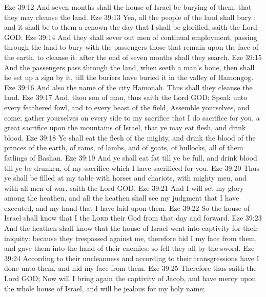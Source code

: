 \vs Eze 39:12 And seven months shall the house of Israel be burying of them, that they may cleanse the land.
\vs Eze 39:13 Yea, all the people of the land shall bury ; and it shall be to them a renown the day that I shall be glorified, saith the Lord GOD.
\vs Eze 39:14 And they shall sever out men of continual employment, passing through the land to bury with the passengers those that remain upon the face of the earth, to cleanse it: after the end of seven months shall they search.
\vs Eze 39:15 And the passengers  pass through the land, when  seeth a man's bone, then shall he set up a sign by it, till the buriers have buried it in the valley of Hamongog.
\vs Eze 39:16 And also the name of the city  Hamonah. Thus shall they cleanse the land.
\vs Eze 39:17 And, thou son of man, thus saith the Lord GOD; Speak unto every feathered fowl, and to every beast of the field, Assemble yourselves, and come; gather yourselves on every side to my sacrifice that I do sacrifice for you,  a great sacrifice upon the mountains of Israel, that ye may eat flesh, and drink blood.
\vs Eze 39:18 Ye shall eat the flesh of the mighty, and drink the blood of the princes of the earth, of rams, of lambs, and of goats, of bullocks, all of them fatlings of Bashan.
\vs Eze 39:19 And ye shall eat fat till ye be full, and drink blood till ye be drunken, of my sacrifice which I have sacrificed for you.
\vs Eze 39:20 Thus ye shall be filled at my table with horses and chariots, with mighty men, and with all men of war, saith the Lord GOD.
\vs Eze 39:21 And I will set my glory among the heathen, and all the heathen shall see my judgment that I have executed, and my hand that I have laid upon them.
\vs Eze 39:22 So the house of Israel shall know that I  the \textsc{Lord} their God from that day and forward.
\vs Eze 39:23 And the heathen shall know that the house of Israel went into captivity for their iniquity: because they trespassed against me, therefore hid I my face from them, and gave them into the hand of their enemies: so fell they all by the sword.
\vs Eze 39:24 According to their uncleanness and according to their transgressions have I done unto them, and hid my face from them.
\vs Eze 39:25 Therefore thus saith the Lord GOD; Now will I bring again the captivity of Jacob, and have mercy upon the whole house of Israel, and will be jealous for my holy name;
